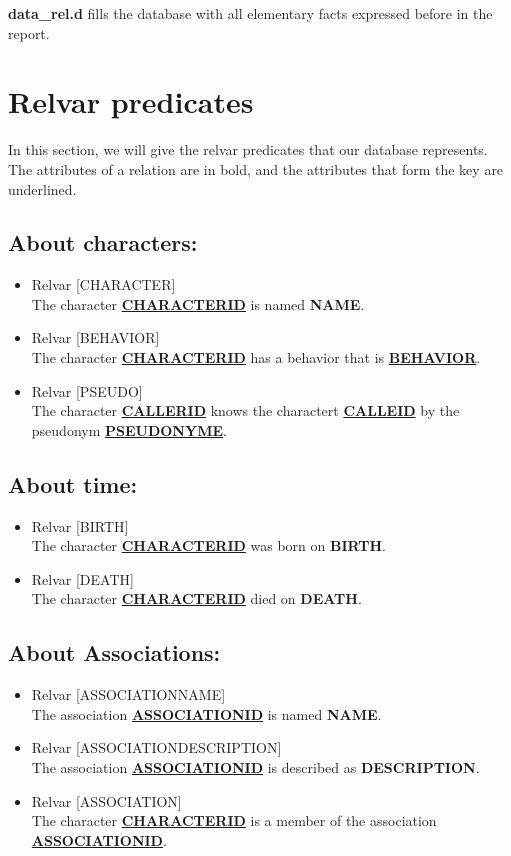 \documentclass[a4paper ,12pt,french]{article}
\begin{document}
\textbf{data\_rel.d} fills the database with all elementary facts expressed before in the report.

\section{Relvar predicates}
In this section, we will give the relvar predicates that our database represents. The attributes of a relation are in bold, and the attributes that form the key are underlined.

\subsection*{About characters:}
\begin{itemize}
\item Relvar [CHARACTER] \\  The character \underline{\textbf{CHARACTERID}} is named \textbf{NAME}.
\item Relvar [BEHAVIOR] \\  The character \underline{\textbf{CHARACTERID}} has a behavior that is \underline{\textbf{BEHAVIOR}}.
\item Relvar [PSEUDO] \\  The character \underline{\textbf{CALLERID}} knows the charactert \underline{\textbf{CALLEID}} by the pseudonym \underline{\textbf{PSEUDONYME}}.
\end{itemize}

\subsection*{About time:}
\begin{itemize}
\item Relvar [BIRTH] \\   The character \underline{\textbf{CHARACTERID}} was born on \textbf{BIRTH}.
\item Relvar [DEATH] \\   The character \underline{\textbf{CHARACTERID}} died on \textbf{DEATH}.
\end{itemize}

\subsection*{About Associations:}
\begin{itemize}
\item Relvar [ASSOCIATIONNAME] \\   The association \underline{\textbf{ASSOCIATIONID}} is named \textbf{NAME}.
\item Relvar [ASSOCIATIONDESCRIPTION] \\   The association \underline{\textbf{ASSOCIATIONID}} is described as \textbf{DESCRIPTION}.
\item Relvar [ASSOCIATION] \\   The character \underline{\textbf{CHARACTERID}} is a member of the association \underline{\textbf{ASSOCIATIONID}}.
\end{itemize}
\end{document}
